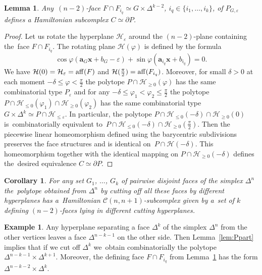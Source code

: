 \documentclass[12pt]{amsart}
\newtheorem{corollary}[formula]{Corollary}
\newtheorem{lemma}[formula]{Lemma}
\theoremstyle{definition}
\newtheorem{example}[formula]{Example}
\theoremstyle{remark}
\begin{document}
\begin{lemma}\label{lem:defPG}
Any~$(n-2)$-face $F\cap F_{i_q}\simeq G\times\Delta^{k-2}$, $i_q\in\{i_1,\dots, i_k\}$, of $P_{G,\varepsilon}$ defines a Hamiltonian subcomplex
$C\simeq \partial P$.
\end{lemma} 
\begin{proof}
Let us rotate the hyperplane $\mathcal{H}_{\varepsilon}$ around the $(n-2)$-plane containing 
the~face $F\cap F_{i_q}$. The rotating plane $\mathcal{H}(\varphi)$ is defined by the formula 
$$
\cos \varphi(\boldsymbol{a}_G\boldsymbol{x}+b_G-\varepsilon)+\sin \varphi(\boldsymbol{a}_{i_q}\boldsymbol{x}+b_{i_q})=0.
$$ 
We have $\mathcal{H}(0)=\mathcal{H}_{\varepsilon}={\rm aff}(F)$ and $\mathcal{H}(\frac{\pi}{2})={\rm aff}(F_{i_q})$. 
Moreover, for small $\delta>0$ at each moment 
$-\delta\leqslant \varphi<\frac{\pi}{2}$ the polytope $P\cap \mathcal{H}_{\geqslant 0}(\varphi)$ has the same combinatorial
type $P_{\varepsilon}$ and for any 
$-\delta\leqslant \varphi_1<\varphi_2\leqslant\frac{\pi}{2}$ the polytope $P\cap \mathcal{H}_{\leqslant 0}(\varphi_1)
\cap \mathcal{H}_{\geqslant 0}(\varphi_2)$ has the same combinatorial type 
$G\times \Delta^k\simeq P\cap \mathcal{H}_{\leqslant \varepsilon}$. In particular, the polytope 
$P\cap \mathcal{H}_{\leqslant 0}(-\delta)\cap \mathcal{H}_{\geqslant 0}(0)$ is~combinatorially equivalent 
to~$P\cap\mathcal{H}_{\leqslant 0}(-\delta)\cap \mathcal{H}_{\geqslant 0}(\frac{\pi}{2})$. Then the piecewise
linear homeomorphism defined using the barycentric subdivisions preserves the face structures and is identical
on~$P\cap\mathcal{H}(-\delta)$. This homeomorphism together with the
identical mapping on $P\cap\mathcal{H}_{\geqslant 0}(-\delta)$ defines the~desired equivalence $C\simeq \partial P$.
\end{proof}
\begin{corollary}\label{cor:cutDn}
For any set $G_1$, $\dots$, $G_k$ of pairwise disjoint faces of the simplex $\Delta^n$
the~polytope obtained from $\Delta^n$ by cutting off all these faces by different hyperplanes
has a~Hamiltonian $\mathcal{C}(n,n+1)$-subcomplex given by a~set of $k$ defining $(n-2)$-faces lying 
in different cutting hyperplanes. 
\end{corollary}
\begin{example}
Any hyperplane separating a face $\Delta^k$ of the simplex $\Delta^n$ from the other
vertices leaves a face $\Delta^{n-k-1}$ on the other side. Then Lemma~\ref{lem:Ppart}
implies that if we cut off  $\Delta^k$ we~obtain combinatorially the polytope $\Delta^{n-k-1}\times\Delta^{k+1}$.
Moreover, the defining face $F\cap F_{i_q}$ from Lemma~\ref{lem:defPG} has the form $\Delta^{n-k-2}\times\Delta^k$.
\end{example}
\end{document}
